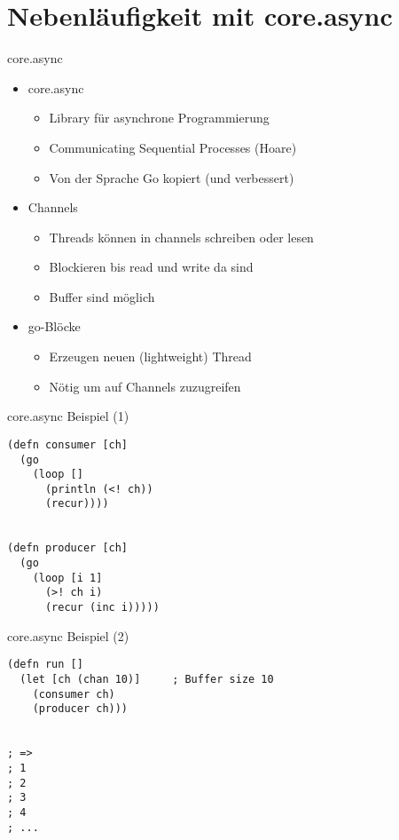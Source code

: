 \documentclass[presentation]{beamer}
\begin{document}
\section{Nebenläufigkeit mit core.async}

\begin{frame}{core.async}
  \begin{itemize}
  \item core.async
    \begin{itemize}
    \item Library für asynchrone Programmierung
    \item Communicating Sequential Processes (Hoare)
    \item Von der Sprache Go kopiert (und verbessert)
    \end{itemize}
  \item Channels
    \begin{itemize}
    \item Threads können in channels schreiben oder lesen
    \item Blockieren bis read und write da sind
    \item Buffer sind möglich
    \end{itemize}
  \item go-Blöcke
    \begin{itemize}
    \item Erzeugen neuen (lightweight) Thread
    \item Nötig um auf Channels zuzugreifen
    \end{itemize}
  \end{itemize}
\end{frame}

\begin{frame}[fragile]{core.async Beispiel (1)}
  \begin{block}{}
\begin{verbatim}
(defn consumer [ch]
  (go
    (loop []
      (println (<! ch))
      (recur))))


(defn producer [ch]
  (go
    (loop [i 1]
      (>! ch i)
      (recur (inc i)))))
\end{verbatim}
  \end{block}
\end{frame}

\begin{frame}[fragile]{core.async Beispiel (2)}
  \begin{block}{}
\begin{verbatim}
(defn run []
  (let [ch (chan 10)]     ; Buffer size 10
    (consumer ch)
    (producer ch)))


; =>
; 1
; 2
; 3
; 4
; ...
\end{verbatim}
  \end{block}
\end{frame}
\end{document}
